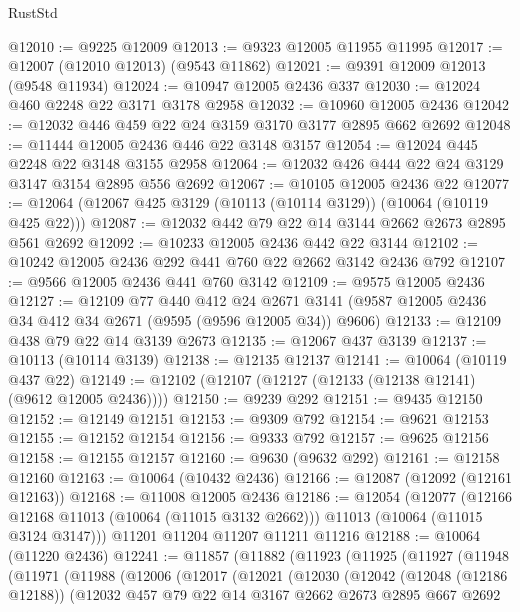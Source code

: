 \begin{lexlean}{RustStd}
\begin{coremodule}
@12010 := @9225 @12009
@12013 := @9323 @12005 @11955 @11995
@12017 := @12007 (@12010 @12013) (@9543 @11862)
@12021 := @9391 @12009 @12013 (@9548 @11934)
@12024 := @10947 @12005 @2436 @337
@12030 := @12024 @460 @2248 @22 @3171 @3178 @2958
@12032 := @10960 @12005 @2436
@12042 := @12032 @446 @459 @22 @24 @3159 @3170 @3177 @2895 @662 @2692
@12048 := @11444 @12005 @2436 @446 @22 @3148 @3157
@12054 := @12024 @445 @2248 @22 @3148 @3155 @2958
@12064 := @12032 @426 @444 @22 @24 @3129 @3147 @3154 @2895 @556 @2692
@12067 := @10105 @12005 @2436 @22
@12077 := @12064 (@12067 @425 @3129 (@10113 (@10114 @3129)) (@10064 (@10119 @425 @22)))
@12087 := @12032 @442 @79 @22 @14 @3144 @2662 @2673 @2895 @561 @2692
@12092 := @10233 @12005 @2436 @442 @22 @3144
@12102 := @10242 @12005 @2436 @292 @441 @760 @22 @2662 @3142 @2436 @792
@12107 := @9566 @12005 @2436 @441 @760 @3142
@12109 := @9575 @12005 @2436
@12127 := @12109
    @77
    @440
    @412
    @24
    @2671
    @3141
    (@9587 @12005 @2436 @34 @412 @34 @2671 (@9595 (@9596 @12005 @34)) @9606)
@12133 := @12109 @438 @79 @22 @14 @3139 @2673
@12135 := @12067 @437 @3139
@12137 := @10113 (@10114 @3139)
@12138 := @12135 @12137
@12141 := @10064 (@10119 @437 @22)
@12149 := @12102 (@12107 (@12127 (@12133 (@12138 @12141) (@9612 @12005 @2436))))
@12150 := @9239 @292
@12151 := @9435 @12150
@12152 := @12149 @12151
@12153 := @9309 @792
@12154 := @9621 @12153
@12155 := @12152 @12154
@12156 := @9333 @792
@12157 := @9625 @12156
@12158 := @12155 @12157
@12160 := @9630 (@9632 @292)
@12161 := @12158 @12160
@12163 := @10064 (@10432 @2436)
@12166 := @12087 (@12092 (@12161 @12163))
@12168 := @11008 @12005 @2436
@12186 := @12054
    (@12077
      (@12166 @12168 @11013 (@10064 (@11015 @3132 @2662)))
      @11013
      (@10064 (@11015 @3124 @3147)))
    @11201
    @11204
    @11207
    @11211
    @11216
@12188 := @10064 (@11220 @2436)
@12241 := @11857
    (@11882
      (@11923
        (@11925
          (@11927
            (@11948
              (@11971
                (@11988
                  (@12006
                    (@12017
                      (@12021
                        (@12030
                          (@12042
                            (@12048 (@12186 @12188))
                            (@12032
                              @457
                              @79
                              @22
                              @14
                              @3167
                              @2662
                              @2673
                              @2895
                              @667
                              @2692

\end{coremodule}
\end{lexlean}
